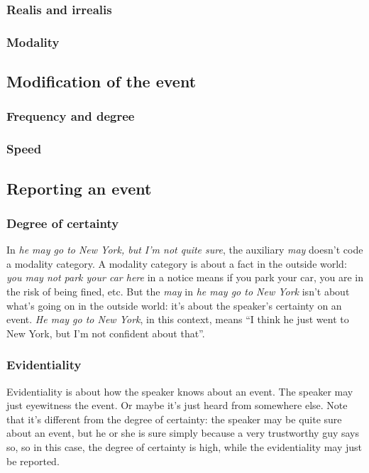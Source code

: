 \documentclass[UTF8, a4paper, oneside, scheme=plain]{ctexart}
\newcommand*{\corpus}[1]{\emph{#1}}
\newcommand{\classify}[1]{{\sc #1}}
\begin{document}
\subsubsection{Realis and irrealis}\label{sec:irrealis}

\subsubsection{Modality}

\subsection{Modification of the event}

\subsubsection{Frequency and degree}

\subsubsection{Speed}

\subsection{Reporting an event}

\subsubsection{Degree of certainty}

In \corpus{he may go to New York, but I'm not quite sure},
the auxiliary \corpus{may} doesn't code a modality category.
A modality category is about a fact in the outside world:
\corpus{you may not park your car here} in a notice 
means if you park your car, 
you are in the risk of being fined, etc.
But the \corpus{may} in \corpus{he may go to New York} 
isn't about what's going on in the outside world:
it's about the speaker's certainty on an event.
\corpus{He may go to New York}, 
in this context, means 
``I think he just went to New York, 
but I'm not confident about that''.

\subsubsection{Evidentiality}

Evidentiality is about how the speaker knows about an event.
The speaker may just eyewitness the event.
Or maybe it's just heard from somewhere else.
Note that it's different from the degree of certainty:
the speaker may be quite sure about an event,
but he or she is sure simply because 
a very trustworthy guy says so,
so in this case, 
the degree of certainty is high,
while the evidentiality may just be \classify{reported}.
\end{document}
